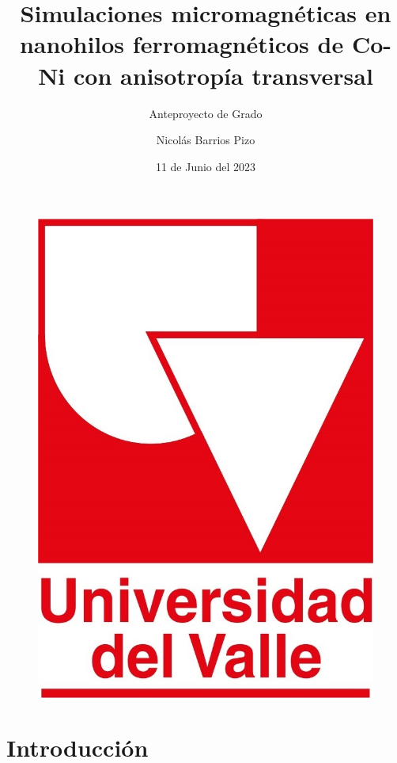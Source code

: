 \documentclass{beamer}
\author{Nicolás Barrios Pizo}
\title{Simulaciones micromagnéticas en nanohilos ferromagnéticos de Co-Ni con anisotropía transversal}
\subtitle{Anteproyecto de Grado}
\institute{
    Departamento de Física \\
    Universidad del Valle
}
\date{11 de Junio del 2023}
\begin{document}
\begin{frame}
    \titlepage
    \begin{figure}[!htp]
        \centering
        \includegraphics[keepaspectratio, scale=0.045]{../Main/logoUV_Oficial_Rojo.jpg}
    \end{figure}
\end{frame}

\begin{frame}
    \tableofcontents[sectionstyle=show,subsectionstyle=show/shaded/hide,subsubsectionstyle=show/shaded/hide]
\end{frame}

\section{Introducción}
\end{document}
